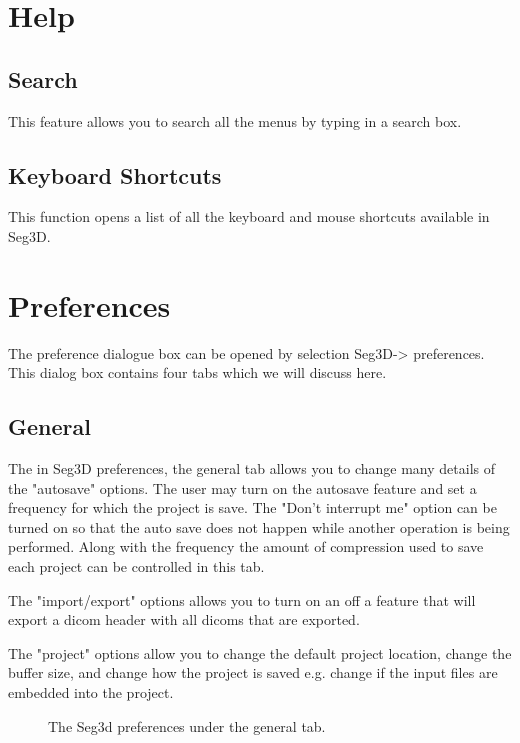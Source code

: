 \documentclass[fleqn,11pt,openany]{book}
\begin{document}
\section{Help}
\subsection{Search}
This feature allows you to search all the menus by typing in a search box.

\subsection{Keyboard Shortcuts}
This function opens a list of all the keyboard and mouse shortcuts available in Seg3D.

\section{Preferences}
\label{sec:preferences}
The preference dialogue box can be opened by selection Seg3D-> preferences.  This dialog box
contains four tabs which we will discuss here.


\subsection{General}
The in Seg3D preferences, the general tab allows you to change many details of the "autosave" options.  The user
may turn on the autosave feature and set a frequency for which the project is save.  The "Don't interrupt me" option 
can be turned on so that the auto save does not happen while another operation is being performed. Along with the
frequency the amount of compression used to save each project can be controlled in this tab.  

The "import/export" options allows you to turn on an off a feature that will export a dicom header with all dicoms that are
exported.

The "project" options allow you to change the default project location, change the buffer size, and change how the project
is saved e.g. change if the input files are embedded into the project.

\begin{figure}[h!]
\caption{The Seg3d preferences under the general tab.}\label{fig:Pref_gen}
\end{figure}
\end{document}
